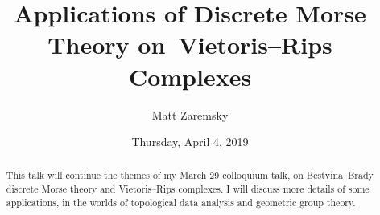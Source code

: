 \documentclass{UAmathtalk}
\author{Matt Zaremsky}
\title{Applications of Discrete Morse Theory on~Vietoris--Rips Complexes}
\date{Thursday, April 4, 2019}
\begin{document}
\maketitle

\begin{abstract}
This talk will continue the themes of my March 29 colloquium talk, on Bestvina--Brady discrete Morse theory and Vietoris--Rips complexes. I will discuss more details of some applications, in the worlds of topological data analysis and geometric group theory.
\end{abstract}
\end{document}
